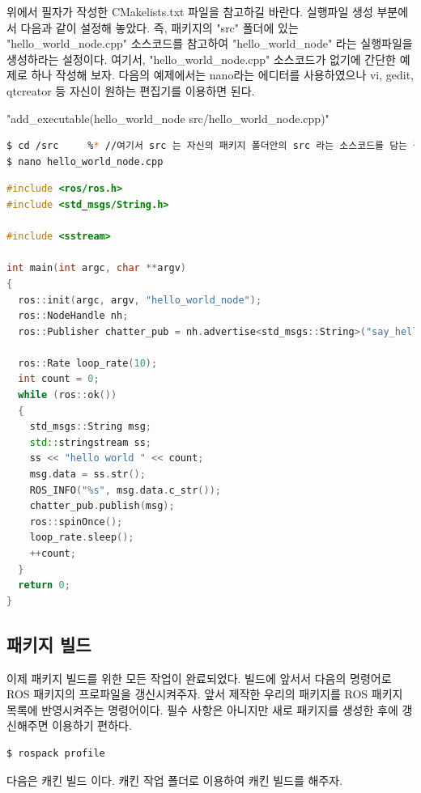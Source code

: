 위에서 필자가 작성한 CMakelists.txt 파일을 참고하길 바란다. 실행파일 생성 부분에서 다음과 같이 설정해 놓았다. 즉, 패키지의 "src" 폴더에 있는 "hello\_world\_node.cpp" 소스코드를 참고하여 "hello\_world\_node" 라는 실행파일을 생성하라는 설정이다. 여기서, "hello\_world\_node.cpp" 소스코드가 없기에 간단한 예제로 하나 작성해 보자. 다음의 예제에서는 nano라는 에디터를 사용하였으나 vi, gedit, qtcreator 등 자신이 원하는 편집기를 이용하면 된다.

\noindent
"add\_executable(hello\_world\_node src/hello\_world\_node.cpp)"

\begin{lstlisting}[language=bash]
$ cd /src     %* //여기서 src 는 자신의 패키지 폴더안의 src 라는 소스코드를 담는 폴더를 말한다.*)
$ nano hello_world_node.cpp
\end{lstlisting}

\begin{lstlisting}[language=C++]
#include <ros/ros.h>
#include <std_msgs/String.h>

#include <sstream>

int main(int argc, char **argv)
{
  ros::init(argc, argv, "hello_world_node");
  ros::NodeHandle nh;
  ros::Publisher chatter_pub = nh.advertise<std_msgs::String>("say_hello_world", 1000);

  ros::Rate loop_rate(10);
  int count = 0;
  while (ros::ok())
  {
    std_msgs::String msg;
    std::stringstream ss;
    ss << "hello world " << count;
    msg.data = ss.str();
    ROS_INFO("%s", msg.data.c_str());
    chatter_pub.publish(msg);
    ros::spinOnce();
    loop_rate.sleep();
    ++count;
  }
  return 0;
}
\end{lstlisting}

\subsection{패키지 빌드}

이제 패키지 빌드를 위한 모든 작업이 완료되었다.  빌드에 앞서서 다음의 명령어로 ROS 패키지의 프로파일을 갱신시켜주자. 앞서 제작한 우리의 패키지를 ROS 패키지 목록에 반영시켜주는 명령어이다. 필수 사항은 아니지만 새로 패키지를 생성한 후에 갱신해주면 이용하기 편하다.

\begin{lstlisting}[language=bash]
$ rospack profile
\end{lstlisting}

\noindent
다음은 캐킨 빌드 이다. 캐킨 작업 폴더로 이용하여 캐킨 빌드를 해주자.


